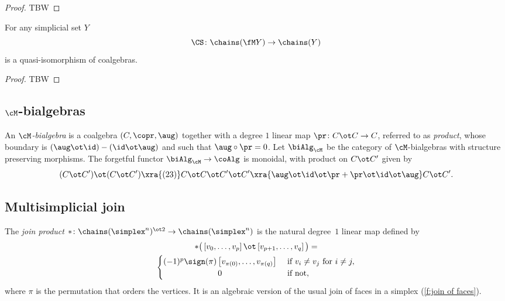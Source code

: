 \begin{proof}
	TBW 
\end{proof}

\begin{theorem}
	For any simplicial set $Y$
	\[
	\CS \colon \chains(\fM Y) \to \chains(Y)
	\]
	is a quasi-isomorphism of coalgebras.
\end{theorem}

\begin{proof}
	TBW 
\end{proof}

\subsection{$\cM$-bialgebras}

An \textit{$\cM$-bialgebra} is a coalgebra $(C, \copr, \aug)$ together with a degree $1$ linear map $\pr \colon C \ot C \to C$, referred to as \textit{product}, whose boundary is $(\aug \ot \id) - (\id \ot \aug)$ and such that $\aug \circ \pr = 0$.
Let $\biAlg_\cM$ be the category of $\cM$-bialgebras with structure preserving morphisms.
The forgetful functor $\biAlg_\cM \to \coAlg$ is monoidal, with product on $C \ot C^\prime$ given by
\[
(C \ot C^\prime) \ot (C \ot C^\prime) \xra{(23)}
C \ot C \ot C^\prime \ot C^\prime
\xra{\aug \ot \id \ot \pr + \pr \ot \id \ot \aug}
C \ot C^\prime.
\]

\subsection{Multisimplicial join}

The \textit{join product} $\ast \colon \chains(\simplex^n)^{\ot 2} \to \chains(\simplex^n)$ is the natural degree~$1$ linear map defined by
\begin{multline}
	\ast \big(\left[v_0, \dots, v_p \right] \ot \left[v_{p+1}, \dots, v_q\right]\big) = \\
	\begin{cases} (-1)^{p} \sign(\pi) \left[v_{\pi(0)}, \dots, v_{\pi(q)}\right] & \text{ if } v_i \neq v_j \text{ for } i \neq j, \\
		\hfil 0 & \text{ if not}, \end{cases}
\end{multline}
where $\pi$ is the permutation that orders the vertices.
It is an algebraic version of the usual join of faces in a simplex (\cref{f:join of faces}).

